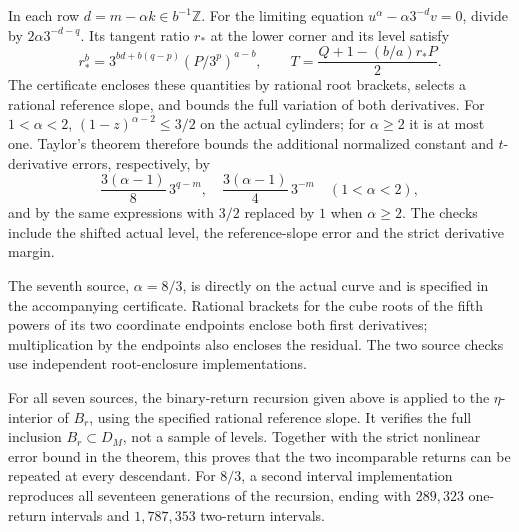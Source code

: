 \documentclass[11pt,a4paper]{article}
\begin{document}
In each row \(d=m-\alpha k\in b^{-1}\mathbb Z\).
For the limiting equation \(u^\alpha-\alpha3^{-d}v=0\), divide by
\(2\alpha3^{-d-q}\). Its tangent ratio \(r_*\) at the lower corner
and its level satisfy
\[
r_*^b=3^{bd+b(q-p)}(P/3^p)^{a-b},\qquad
T=\frac{Q+1-(b/a)r_*P}{2}.
\]
The certificate encloses these quantities by rational root brackets,
selects a rational reference slope, and bounds the full variation
of both derivatives. For \(1<\alpha<2\),
\((1-z)^{\alpha-2}\leq3/2\) on the actual cylinders; for \(\alpha\geq2\)
it is at most one. Taylor's theorem therefore bounds the additional
normalized constant and \(t\)-derivative errors, respectively, by
\[
\frac{3(\alpha-1)}8\,3^{q-m},\quad
\frac{3(\alpha-1)}4\,3^{-m}
\quad(1<\alpha<2),
\]
and by the same expressions with \(3/2\) replaced by \(1\)
when \(\alpha\geq2\). The checks include the shifted actual level,
the reference-slope error and the strict derivative margin.

The seventh source, \(\alpha=8/3\), is directly on the actual curve
and is specified in the accompanying certificate. Rational brackets for the
cube roots of the fifth powers of its two coordinate endpoints
enclose both first derivatives; multiplication by the endpoints
also encloses the residual. The two source checks use independent
root-enclosure implementations.

For all seven sources, the binary-return recursion given above
is applied to the \(\eta\)-interior of \(B_r\), using the specified
rational reference slope. It verifies the full inclusion
\(B_r\subset D_M\), not a sample of levels. Together with the
strict nonlinear error bound in the theorem, this proves that
the two incomparable returns can be repeated at every descendant.
For \(8/3\), a second interval implementation reproduces all
seventeen generations of the recursion, ending with \(289{,}323\)
one-return intervals and \(1{,}787{,}353\) two-return intervals.
\end{document}

